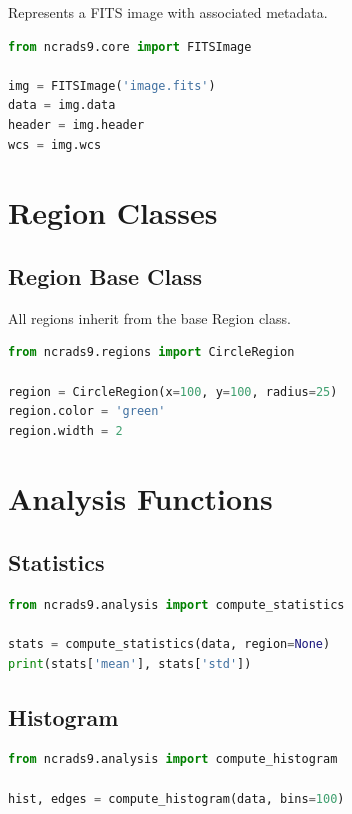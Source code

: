 \documentclass[11pt,a4paper]{report}
\begin{document}
Represents a FITS image with associated metadata.

\begin{lstlisting}[language=Python]
from ncrads9.core import FITSImage

img = FITSImage('image.fits')
data = img.data
header = img.header
wcs = img.wcs
\end{lstlisting}

\section{Region Classes}

\subsection{Region Base Class}

All regions inherit from the base Region class.

\begin{lstlisting}[language=Python]
from ncrads9.regions import CircleRegion

region = CircleRegion(x=100, y=100, radius=25)
region.color = 'green'
region.width = 2
\end{lstlisting}

\section{Analysis Functions}

\subsection{Statistics}

\begin{lstlisting}[language=Python]
from ncrads9.analysis import compute_statistics

stats = compute_statistics(data, region=None)
print(stats['mean'], stats['std'])
\end{lstlisting}

\subsection{Histogram}

\begin{lstlisting}[language=Python]
from ncrads9.analysis import compute_histogram

hist, edges = compute_histogram(data, bins=100)
\end{lstlisting}
\end{document}
